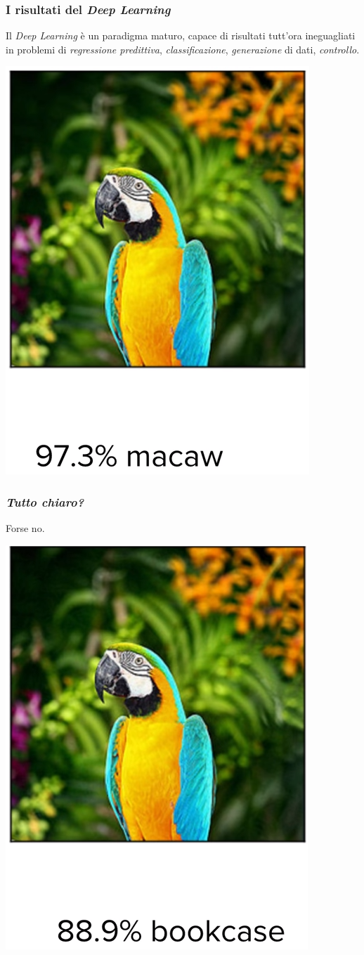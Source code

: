 \documentclass{beamer}
\begin{document}
{%

\begin{frame}
	\frametitle{I risultati del \textit{Deep Learning}}
	Il \textit{Deep Learning} è un paradigma maturo, capace di risultati tutt'ora ineguagliati in problemi di \textit{regressione predittiva}, \textit{classificazione}, \textit{generazione} di dati, \textit{controllo}.

	\hfill\break

		\center \includegraphics[height=0.35\linewidth]{pappagallo.png}



\end{frame}


\begin{frame}
	\frametitle{\textit{Tutto chiaro?}}
	Forse no.

	\hfill\break

	\center \includegraphics[height=0.35\linewidth]{libreria.png}

	\hfill\break
\end{frame}

}



\end{document}
